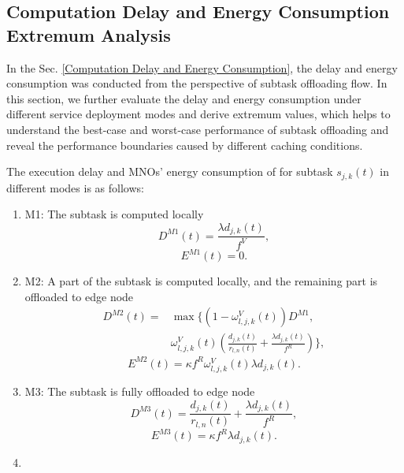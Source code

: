 \documentclass[lettersize,journal]{IEEEtran}
\begin{document}
\subsection{Computation Delay and Energy Consumption Extremum Analysis}
In the Sec. \ref{Computation Delay and Energy Consumption}, the delay and energy consumption was conducted from the perspective of subtask offloading flow. 
In this section, we further evaluate the delay and energy consumption under different service deployment modes and derive extremum values, which helps to understand the best-case and worst-case performance of subtask offloading and reveal the performance boundaries caused by different caching conditions.

The execution delay and MNOs' energy consumption  of for subtask $ s_{j,k}(t) $ in different modes is as follows:
\begin{enumerate}
	\item
	M1: The subtask is computed locally 
	\begin{equation}
		\label{equ: M1}
		D^{M1}(t)= \frac{\lambda d_{j,k}(t)}{f^{V}},
	\end{equation}
	\begin{equation}
		E^{M1}(t) = 0.
   \end{equation}
	\item 
	M2: A part of the subtask is computed locally, and the remaining part is offloaded to edge node
	\begin{equation}
		\label{equ: M2}
		\begin{aligned}
			D^{M2}(t)=& \max \Bigg\{(1-\omega^{V}_{l,j,k}(t)) D^{M1} , \\
			&\omega^{V}_{l,j,k}(t)\left( \frac{d_{j,k}(t)}{r_{l,n}(t)} +\frac{\lambda d_{j,k}(t)}{f^{R}}  \right)\Bigg\},
		\end{aligned}
	\end{equation} 
	\begin{equation}
		E^{M2}(t) = \kappa f^{R} \omega^{V}_{l,j,k}(t) \lambda d_{j,k}(t).
	\end{equation}
	\item
	M3: The subtask is fully offloaded to edge node
	\begin{equation}
		\label{equ: M3}
		D^{M3}(t)=  \frac{d_{j,k}(t)}{r_{l,n}(t)} +\frac{\lambda d_{j,k}(t)}{f^{R}},
	\end{equation}
	\begin{equation}
		E^{M3}(t) = \kappa f^{R} \lambda d_{j,k}(t).
	\end{equation}
	\item

\end{enumerate}
\end{document}
